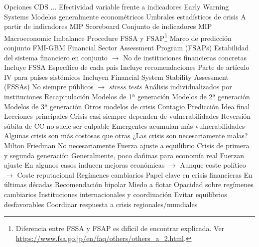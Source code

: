 \documentclass{nuevotema}
\begin{document}
\begin{esquemal}
				\4[] Opciones
				\4[] CDS
				\4[] ...
				\4 Efectividad variable frente a indicadores
			\3 Early Warning Systems
				\4 Modelos generalmente econométricos
				\4 Umbrales estadísticos de crisis
				\4[] A partir de indicadores
			\3 MIP Scoreboard
				\4 Conjunto de indicadores MIP
				\4 Macroeconomic Imbalance Procedure
			\3 FSSA y FSAP\footnote{Diferencia entre FSSA y FSAP es difícil de encontrar explicada. Ver \url{https://www.fsa.go.jp/en/faq/others/others_a_2.html}.}
				\4 Marco de predicción conjunto FMI-GBM
				\4 Financial Sector Assessment Program (FSAPs)
				\4[] Estabilidad del sistema financiero en conjunto
				\4[] $\to$ No de instituciones financieras concretas
				\4[] Incluye FSSA
				\4[] Específico de cada país
				\4[] Incluye recomendaciones
				\4[] Parte de artículo IV para países sistémicos
				\4 Incluyen Financial System Stability Assessment (FSSAs)
				\4[] No siempre públicos
				\4[] $\to$ \textit{stress tests}
				\4[] Análisis individualizados por instituciones
	\1[] 
		\2 Recapitulación
			\3 Modelos de 1ª generación
			\3 Modelos de 2ª generación
			\3 Modelos de 3ª generación
			\3 Otros modelos de crisis
			\3 Contagio
			\3 Predicción
		\2 Idea final
			\3 Lecciones principales
				\4[I] Crisis casi siempre dependen de vulnerabilidades
				\4[II] Reversión súbita de CC no suele ser culpable
				\4[III] Emergentes acumulan más vulnerabilidades
				\4[IV] Algunas crisis son más costosas que otras
			\3 ¿Las crisis son necesariamente malas?
				\4 Milton Friedman
				\4[] No necesariamente
				\4[] Fuerza ajuste a equilibrio
				\4 Crisis de primera y segunda generación
				\4[] Generalmente, poco dañinas para economía real
				\4[] Fuerzan ajuste
				\4[] En algunos casos inducen mejoras económicas
				\4[] $\to$ Aunque coste político
				\4[] $\to$ Coste reputacional
			\3 Regímenes cambiarios
				\4 Papel clave en crisis financieras
				\4 En últimas décadas
				\4[] Recomendación bipolar
				\4[] Miedo a flotar
				\4[] Opacidad sobre regímenes cambiarios
			\3 Instituciones internacionales y coordinación
				\4 Evitar equilibrios desfavorables
				\4 Coordinar respuesta a crisis regionales/mundiales
\end{esquemal}
\end{document}
